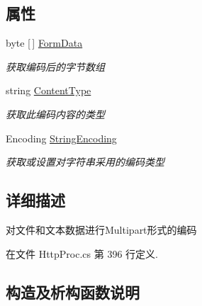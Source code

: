 \subsection*{属性}
\begin{DoxyCompactItemize}
\item 
byte \mbox{[}$\,$\mbox{]} \hyperlink{class_x_c_l_net_tools_1_1_file_handler_1_1_multipart_form_ad540886372239dbb4fcc975e694be5d9}{Form\+Data}
\begin{DoxyCompactList}\small\item\em 获取编码后的字节数组 \end{DoxyCompactList}\item 
string \hyperlink{class_x_c_l_net_tools_1_1_file_handler_1_1_multipart_form_a634f22e875a4d7eb49a729dcb2903f86}{Content\+Type}
\begin{DoxyCompactList}\small\item\em 获取此编码内容的类型 \end{DoxyCompactList}\item 
Encoding \hyperlink{class_x_c_l_net_tools_1_1_file_handler_1_1_multipart_form_ade83206c0e41ad24ba543ebd89e0281f}{String\+Encoding}
\begin{DoxyCompactList}\small\item\em 获取或设置对字符串采用的编码类型 \end{DoxyCompactList}\end{DoxyCompactItemize}


\subsection{详细描述}
对文件和文本数据进行\+Multipart形式的编码 



在文件 Http\+Proc.\+cs 第 396 行定义.



\subsection{构造及析构函数说明}
\mbox{\label{class_x_c_l_net_tools_1_1_file_handler_1_1_multipart_form_ab1d1debcf1e0f5dc05e9758f72b4500d}} 
